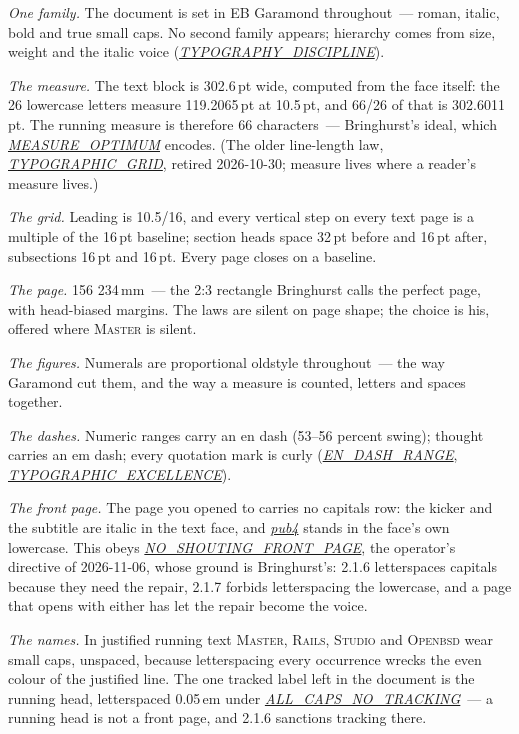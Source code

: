 \documentclass[oneside]{article}
\newcommand{\treename}[1]{\mbox{\textsc{#1}}}
\newcommand{\mtree}{\treename{Master}}
\newcommand{\rtree}{\treename{Rails}}
\newcommand{\stree}{\treename{Studio}}
\newcommand{\otree}{\treename{Openbsd}}
\newcommand{\fpath}[1]{\emph{\url{#1}}}
\begin{document}
\emph{One family.} The document is set in EB Garamond throughout~--- roman, italic, bold and true small caps. No second family appears; hierarchy comes from size, weight and the italic voice (\fpath{TYPOGRAPHY_DISCIPLINE}).

\emph{The measure.} The text block is 302.6\,pt wide, computed from the face itself: the 26 lowercase letters measure 119.2065\,pt at 10.5\,pt, and 66/26 of that is 302.6011\,pt. The running measure is therefore 66 characters~--- Bringhurst's ideal, which \fpath{MEASURE_OPTIMUM} encodes. (The older line-length law, \fpath{TYPOGRAPHIC_GRID}, retired 2026-10-30; measure lives where a reader's measure lives.)

\emph{The grid.} Leading is 10.5/16, and every vertical step on every text page is a multiple of the 16\,pt baseline; section heads space 32\,pt before and 16\,pt after, subsections 16\,pt and 16\,pt. Every page closes on a baseline.

\emph{The page.} 156\,\texttimes\,234\,mm~--- the 2:3 rectangle Bringhurst calls the perfect page, with head-biased margins. The laws are silent on page shape; the choice is his, offered where \mtree{} is silent.

\emph{The figures.} Numerals are proportional oldstyle throughout~--- the way Garamond cut them, and the way a measure is counted, letters and spaces together.

\emph{The dashes.} Numeric ranges carry an en dash (53--56 percent swing); thought carries an em dash; every quotation mark is curly (\fpath{EN_DASH_RANGE}, \fpath{TYPOGRAPHIC_EXCELLENCE}).

\emph{The front page.} The page you opened to carries no capitals row: the kicker and the subtitle are italic in the text face, and \fpath{pub4} stands in the face's own lowercase. This obeys \fpath{NO_SHOUTING_FRONT_PAGE}, the operator's directive of 2026-11-06, whose ground is Bringhurst's: 2.1.6 letterspaces capitals because they need the repair, 2.1.7 forbids letterspacing the lowercase, and a page that opens with either has let the repair become the voice.

\emph{The names.} In justified running text \mtree, \rtree, \stree{} and \otree{} wear small caps, unspaced, because letterspacing every occurrence wrecks the even colour of the justified line. The one tracked label left in the document is the running head, letterspaced 0.05\,em under \fpath{ALL_CAPS_NO_TRACKING}~--- a running head is not a front page, and 2.1.6 sanctions tracking there.
\end{document}
